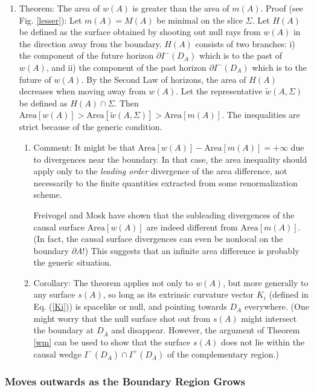 \documentclass{article}
\begin{document}
\begin{enumerate}[resume]
\item Theorem: The area of $w(A)$ is greater than the area of $m(A)$.  Proof (see Fig. \ref{lesser}): Let $m(A) = M(A)$ be minimal on the slice $\Sigma$.  Let $H(A)$ be defined as the surface obtained by shooting out null rays from $w(A)$ in the direction away from the boundary.  $H(A)$ consists of two branches: i) the component of the future horizon $\partial I^-(D_A)$ which is to the past of $w(A)$, and ii) the component of the past horizon $\partial I^-(D_A)$ which is to the future of $w(A)$.  By the Second Law of horizons, the area of $H(A)$ decreases when moving away from $w(A)$.  Let the representative $\tilde{w}(A, \Sigma)$ be defined as $H(A) \cap \Sigma$.  Then $\mathrm{Area}[w(A)] > \mathrm{Area}[\tilde{w}(A, \Sigma)] > \mathrm{Area}[m(A)]$.  The inequalities are strict because of the generic condition.
	\begin{enumerate}
	\item Comment: It might be that $\mathrm{Area}[w(A)] - \mathrm{Area}[m(A)] = +\infty$ due to divergences near the boundary.  In that case, the area inequality should apply only to the \emph{leading order} divergence of the area difference, not necessarily to the finite quantities extracted from some renormalization scheme.

Freivogel and Mosk \cite{FM13} have shown that the subleading divergences of the causal surface $\mathrm{Area}[w(A)]$ are indeed different from $\mathrm{Area}[m(A)]$.  (In fact, the causal surface divergences can even be nonlocal on the boundary $\partial A$!)  This suggests that an infinite area difference is probably the generic situation.

	\item Corollary: The theorem applies not only to $w(A)$, but more generally to any surface $s(A)$, so long as its extrinsic curvature vector $K_i$ (defined in Eq. (\ref{Ki})) is spacelike or null, and pointing towards $D_A$ everywhere.  (One might worry that the null surface shot out from $s(A)$ might intersect the boundary at $D_{\bar{A}}$ and disappear.  However, the argument of Theorem \ref{wm} can be used to show that the surface $s(A)$ does not lie within the causal wedge
$I^-(D_{\bar{A}}) \cap I^+(D_{\bar{A}})$ of the complementary region.)
	\end{enumerate}
\end{enumerate}

\subsubsection{Moves outwards as the Boundary Region Grows}\label{GROW}
\end{document}
